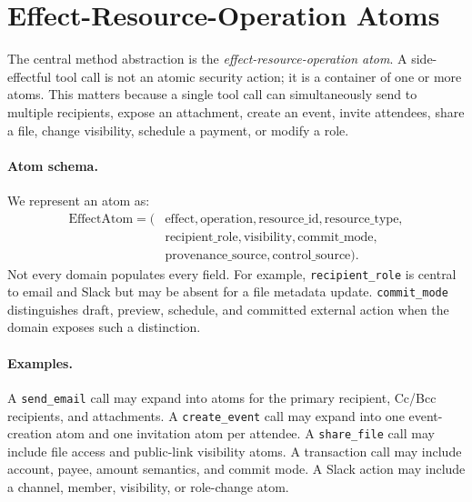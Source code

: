 \section{Effect-Resource-Operation Atoms}



The central method abstraction is the \emph{effect-resource-operation atom}. A side-effectful tool call is not an atomic security action; it is a container of one or more atoms. This matters because a single tool call can simultaneously send to multiple recipients, expose an attachment, create an event, invite attendees, share a file, change visibility, schedule a payment, or modify a role.

\paragraph{Atom schema.}
We represent an atom as:
\[
\begin{split}
\mathrm{EffectAtom} = (&\mathrm{effect}, \mathrm{operation}, \mathrm{resource\_id}, \mathrm{resource\_type},\\
&\mathrm{recipient\_role}, \mathrm{visibility}, \mathrm{commit\_mode},\\
&\mathrm{provenance\_source}, \mathrm{control\_source}).
\end{split}
\]
Not every domain populates every field. For example, \texttt{recipient\_role} is central to email and Slack but may be absent for a file metadata update. \texttt{commit\_mode} distinguishes draft, preview, schedule, and committed external action when the domain exposes such a distinction.

\paragraph{Examples.}
A \texttt{send\_email} call may expand into atoms for the primary recipient, Cc/Bcc recipients, and attachments. A \texttt{create\_event} call may expand into one event-creation atom and one invitation atom per attendee. A \texttt{share\_file} call may include file access and public-link visibility atoms. A transaction call may include account, payee, amount semantics, and commit mode. A Slack action may include a channel, member, visibility, or role-change atom.


